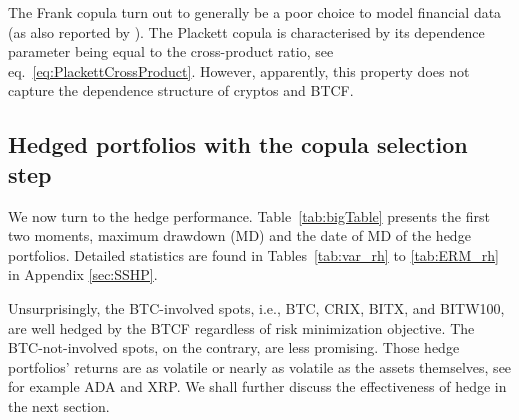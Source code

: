
The Frank copula turn out to generally be a poor choice to model financial
data (as also reported by \cite{barbi2014copula}).
The Plackett copula is characterised by its dependence parameter being
equal to the cross-product ratio, see
eq.~\ref{eq:PlackettCrossProduct}. However, apparently, this property
does not capture the dependence structure of cryptos and BTCF.


\subsection{Hedged portfolios with the copula selection step}\label{subsec:HP2}

\afterpage{
  \begin{landscape}
  
\end{landscape}
}

We now turn to the hedge performance. Table~\ref{tab:bigTable}
presents the first two moments, maximum drawdown (MD) and the date of
MD of the hedge portfolios.  Detailed statistics are found in
Tables~\ref{tab:var_rh} to \ref{tab:ERM_rh} in Appendix
\ref{sec:SSHP}. 
 
Unsurprisingly, the BTC-involved spots, i.e., BTC, CRIX, BITX, and
BITW100, are well hedged by the BTCF regardless of risk minimization
objective. 
The BTC-not-involved spots, on the contrary, are less promising. Those
hedge portfolios' returns are as volatile or nearly as volatile as the
assets themselves, see for example ADA and XRP. 
We shall further discuss the effectiveness of hedge in the next
section. %

